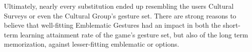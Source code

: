     Ultimately, nearly every substitution ended up resembling the users Cultural Surveys or even the Cultural Group's gesture set. There are strong reasons to believe that well-fitting Emblematic Gestures had an impact in both the short-term learning attainment rate of the game's gesture set, but also of the long term memorization, against lesser-fitting emblematic or options.\\